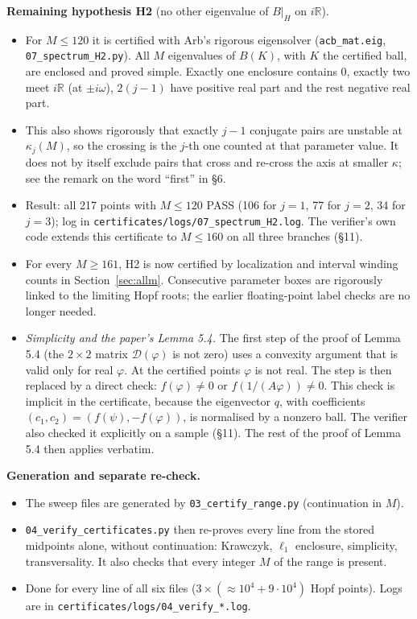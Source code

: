 \documentclass[11pt,a4paper]{report}
\begin{document}
\textbf{Remaining hypothesis H2} (no other eigenvalue of \(B|_H\) on \(i\mathbb R\)).
\begin{itemize}
\tightlist
\item For \(M\le120\) it is certified with Arb's rigorous eigensolver (\texttt{acb\_mat.eig}, \texttt{07\_spectrum\_H2.py}). All \(M\)
eigenvalues of \(B(K)\), with \(K\) the certified ball, are enclosed and proved simple. Exactly one enclosure
contains 0, exactly two meet \(i\mathbb R\) (at \(\pm i\omega\)), \(2(j-1)\) have positive real part and the rest
negative real part.
\item This also shows rigorously that exactly \(j-1\) conjugate pairs are unstable at \(\kappa_j(M)\), so the crossing
is the \(j\)-th one counted at that parameter value. It does not by itself exclude pairs that cross and re-cross
the axis at smaller \(\kappa\); see the remark on the word ``first'' in §6.
\item Result: all 217 points with \(M\le120\) PASS (106 for \(j=1\), 77 for \(j=2\), 34 for \(j=3\));
log in \texttt{certificates/logs/07\_spectrum\_H2.log}. The verifier's own code extends this certificate to
\(M\le160\) on all three branches (§11).
\item For every $M\ge161$, H2 is now certified by localization and interval winding counts
in Section~\ref{sec:allm}. Consecutive parameter boxes are rigorously linked to the
limiting Hopf roots; the earlier floating-point label checks are no longer needed.
\item \emph{Simplicity and the paper's Lemma 5.4.} The first step of the proof of Lemma 5.4 (the \(2\times2\) matrix
\(\mathcal D(\varphi)\) is not zero) uses a convexity argument that is valid only for real \(\varphi\). At the
certified points \(\varphi\) is not real. The step is then replaced by a direct check:
\(f(\varphi)\ne0\) or \(f(1/(A\varphi))\ne0\). This check is implicit in the certificate, because the eigenvector
\(q\), with coefficients \((c_1,c_2)=(f(\psi),-f(\varphi))\), is normalised by a nonzero ball. The verifier also
checked it explicitly on a sample (§11). The rest of the proof of Lemma 5.4 then applies verbatim.
\end{itemize}

\textbf{Generation and separate re-check.}
\begin{itemize}
\tightlist
\item The sweep files are generated by \texttt{03\_certify\_range.py} (continuation in \(M\)).
\item \texttt{04\_verify\_certificates.py} then re-proves every line from the stored midpoints alone, without continuation:
Krawczyk, \(\ell_1\) enclosure, simplicity, transversality. It also checks that every integer \(M\) of the range is
present.
\item Done for every line of all six files (\(3\times(\approx10^4+9\cdot10^4)\) Hopf points). Logs are in
\texttt{certificates/logs/04\_verify\_*.log}.
\end{itemize}
\end{document}
